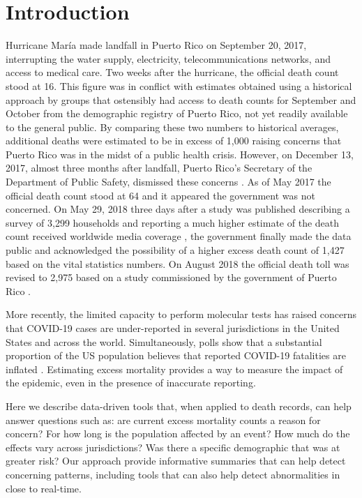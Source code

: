 \documentclass[11pt]{article}
\begin{document}
\newpage

\section{Introduction}
\label{sec:introduction}
Hurricane Mar\'ia made landfall in Puerto Rico on September 20, 2017, interrupting the water supply, electricity, telecommunications networks, and access to medical care\cite{updates2018puerto, rogers2017puerto}. Two weeks after the hurricane, the official death count stood at 16\cite{hoyos2018puerto}. This figure was in conflict with estimates obtained using a historical approach by groups that ostensibly had access to death counts for September and October from the demographic registry of Puerto Rico, not yet readily available to the general public. By comparing these two numbers to historical averages, additional deaths were estimated to be in excess of 1,000 \cite{santos2018use, robles2017official, rivera2018estimating, pascual2017nearly} raising concerns that Puerto Rico was in the midst of a public health crisis. However, on December 13, 2017, almost three months after landfall, Puerto Rico’s Secretary of the Department of Public Safety, dismissed these concerns \cite{robles2017official}. As of May 2017 the official death count stood at 64 \cite{hoyos2018puerto} and it appeared the government was not concerned. On May 29, 2018 three days after a study was published describing a survey of 3,299 households and reporting a much higher estimate of the death count received worldwide media coverage \cite{kishore2018mortality}, the government finally made the data public and acknowledged the possibility of a higher excess death count of 1,427 \cite{report2019} based on the vital statistics numbers. On August 2018 the official death toll was revised to 2,975 based on a study commissioned by the government of Puerto Rico \cite{santos2018differential}.

More recently, the limited capacity to perform molecular tests has raised concerns that COVID-19 cases are under-reported in several jurisdictions in the United States and across the world. Simultaneously, polls show that a substantial proportion of the US population believes that reported COVID-19 fatalities are inflated \cite{talev2020}. Estimating excess mortality provides a way to measure the impact of the epidemic, even in the presence of inaccurate reporting.


Here we describe data-driven tools that, when applied to death records, can help answer questions such as: are current excess mortality counts a reason for concern? For how long is the population affected by an event?  How much do the effects vary across jurisdictions?  Was there a specific demographic that was at greater risk? Our approach provide informative summaries that can help detect concerning patterns, including tools that can also help detect abnormalities in close to real-time. 
\end{document}
